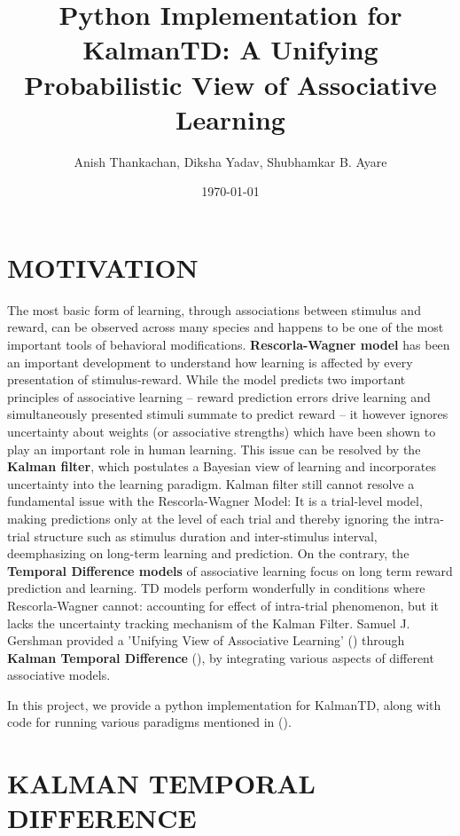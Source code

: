 \documentclass[11pt]{article}
\author{Anish Thankachan, Diksha Yadav, Shubhamkar B. Ayare}
\date{\today}
\title{Python Implementation for KalmanTD: A Unifying Probabilistic View of Associative Learning}
\begin{document}
\maketitle
\tableofcontents



\section{MOTIVATION}
\label{sec:org0ce81a4}

The most basic form of learning, through associations between stimulus and reward, can be observed across many species and happens to be one of the most important tools of behavioral modifications. \textbf{Rescorla-Wagner model} has been an important development to understand how learning is affected by every presentation of stimulus-reward. While the model predicts two important principles of associative learning -- reward prediction errors drive learning and simultaneously presented stimuli summate to predict reward -- it however ignores uncertainty about weights (or associative strengths) which have been shown to play an important role in human learning. This issue can be resolved by the \textbf{Kalman filter}, which postulates a Bayesian view of learning and incorporates uncertainty into the learning paradigm. Kalman filter still cannot resolve a fundamental issue with the Rescorla-Wagner Model: It is a trial-level model, making predictions only at the level of each trial and thereby ignoring the intra-trial structure such as stimulus duration and inter-stimulus interval, deemphasizing on long-term learning and prediction. On the contrary, the \textbf{Temporal Difference models} of associative learning focus on long term reward prediction and learning. TD models perform wonderfully in conditions where Rescorla-Wagner cannot: accounting for effect of intra-trial phenomenon, but it lacks the uncertainty tracking mechanism of the Kalman Filter. Samuel J. Gershman provided a 'Unifying View of Associative Learning' (\cite{Gershman2015}) through \textbf{Kalman Temporal Difference} (\cite{geist2010-kalmantd}), by integrating various aspects of different associative models.

In this project, we provide a python implementation for KalmanTD, along with code for running various paradigms mentioned in (\cite{Gershman2015}).

\section{KALMAN TEMPORAL DIFFERENCE}
\label{sec:org6e59157}
\end{document}
